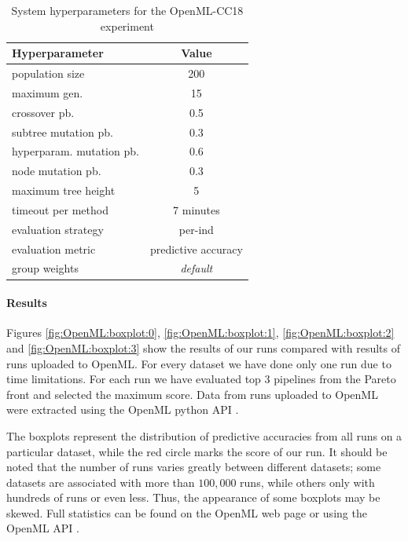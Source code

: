 \begin{table}[ht]

\centering
\caption{System hyperparameters for the OpenML-CC18 experiment}\label{tab04:exp3:setting}
\begin{tabular}{l c}
\toprule
\textbf{\upshape Hyperparameter} & \textbf{Value} \\
\midrule
population size & 200 \\
maximum gen. & 15 \\
crossover pb. & 0.5 \\
subtree mutation pb. & 0.3 \\
hyperparam. mutation pb. & 0.6 \\
node mutation pb. & 0.3 \\
maximum tree height & 5 \\
timeout per method  & 7 minutes \\
evaluation strategy & per-ind \\
evaluation metric & predictive accuracy \\
group weights & \textit{default} \\
\bottomrule

\end{tabular}

\end{table}

\paragraph{Results}
Figures \ref{fig:OpenML:boxplot:0}, \ref{fig:OpenML:boxplot:1},
\ref{fig:OpenML:boxplot:2} and \ref{fig:OpenML:boxplot:3} show the results
of our runs compared with results of runs uploaded to OpenML. For every dataset
we have done only one run due to time limitations. For each run we have
evaluated top 3 pipelines from the Pareto front and selected the maximum score.
Data from runs uploaded to OpenML were extracted using the OpenML python API
\citep{openmlcc18api}.

The boxplots represent the distribution of predictive accuracies from all runs
on a particular dataset, while the red circle marks the score of our run.
It should be noted that the number of runs varies
greatly between different datasets; some datasets are associated with more
than $100,000$ runs, while others only with hundreds of runs or even less. Thus,
the appearance of some boxplots may be skewed. Full statistics can be found on
the OpenML web page or using the OpenML API \citep{openmlcc18, openmlcc18docs}.


